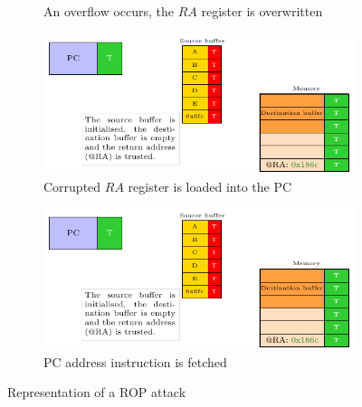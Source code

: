 \begin{figure}[ht]
\begin{subfigure}[b]{0.49\textwidth}
        \caption{An overflow occurs, the $RA$ register is overwritten}
        \label{fig:rop_attack_3}
    \end{subfigure}
    \hfill
    \begin{subfigure}[b]{0.49\textwidth}
        \includegraphics[width=\textwidth, page=4]{c3_vulnerabilities_assessment/img/buffer_overflow/schemaPedagogique.pdf}
        \caption{Corrupted $RA$ register is loaded into the PC}
        \label{fig:rop_attack_4}
    \end{subfigure}
    \hfill
    \begin{subfigure}[b]{0.49\textwidth}
        \includegraphics[width=\textwidth, page=5]{c3_vulnerabilities_assessment/img/buffer_overflow/schemaPedagogique.pdf}
        \caption{PC address instruction is fetched}
        \label{fig:rop_attack_5}
    \end{subfigure}
    \caption{Representation of a ROP attack}
    \label{fig:rop_attack}
\end{figure}


